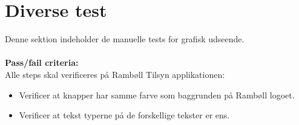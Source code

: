 \section{Diverse test}
Denne sektion indeholder de manuelle tests for grafisk udseende. \\ \\
\textbf{Pass/fail criteria:} \\
Alle steps skal verificeres på Rambøll Tilsyn applikationen:
\begin{itemize}[-]
	\item Verificer at knapper har samme farve som baggrunden på Rambøll logoet.
	\item Verificer at tekst typerne på de forskellige tekster er ens.
\end{itemize}